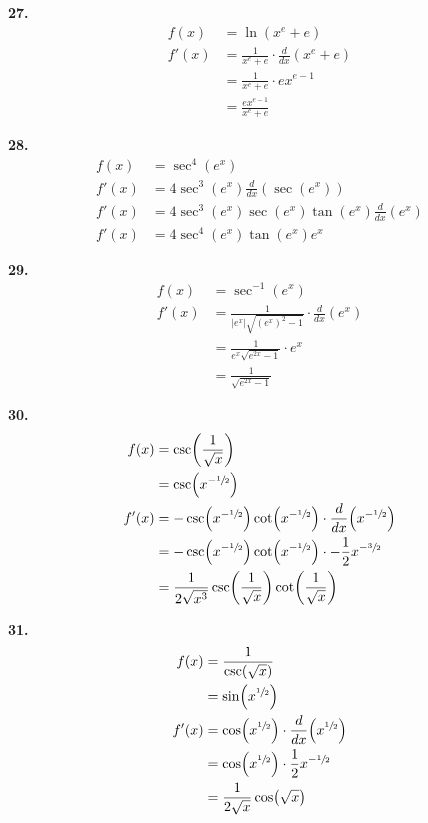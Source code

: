 \documentclass[10pt,oneside,]{book}
\theoremstyle{plain}
\theoremstyle{definition}
\numberwithin{equation}{section}
\newcommand{\fe}[2]{#1\mathopen{}\left(#2\right)\mathclose{}}
\newcommand{\fd}[1]{#1'}
\newcommand{\lzoo}[2]{{\frac{d}{d#1}}{\left(#2\right)}}
\newcommand{\abs}[1]{\left|#1\right|}
\begin{document}
\par\smallskip
\noindent\textbf{27.}\quad{}\begin{align*}
\fe{f}{x}&=\fe{\ln}{x^e+e}\\
\fe{\fd{f}}{x}&=\frac{1}{x^e+e}\cdot\lzoo{x}{x^e+e}\\
&=\frac{1}{x^e+e}\cdot ex^{e-1}\\
&=\frac{ex^{e-1}}{x^e+e}
\end{align*}%
\par\smallskip
\noindent\textbf{28.}\quad{}\begin{align*}
\fe{f}{x}&=\fe{\sec^4}{e^x}\\
\fe{\fd{f}}{x}&=4\fe{\sec^3}{e^x}\lzoo{x}{\fe{\sec}{e^x}}\\
\fe{\fd{f}}{x}&=4\fe{\sec^3}{e^x}\fe{\sec}{e^x}\fe{\tan}{e^x}\lzoo{x}{e^x}\\
\fe{\fd{f}}{x}&=4\fe{\sec^4}{e^x}\fe{\tan}{e^x}e^x
\end{align*}%
\par\smallskip
\noindent\textbf{29.}\quad{}\begin{align*}
\fe{f}{x}&=\fe{\sec^{-1}}{e^x}\\
\fe{\fd{f}}{x}&=\frac{1}{\abs{e^x}\sqrt{\left(e^x\right)^2-1}}\cdot\lzoo{x}{e^x}\\
&=\frac{1}{e^x\sqrt{e^{2x}-1}}\cdot e^x\\
&=\frac{1}{\sqrt{e^{2x}-1}}
\end{align*}%
\par\smallskip
\noindent\textbf{30.}\quad{}\begin{align*}
\fe{f}{x}&=\fe{\csc}{\frac{1}{\sqrt{x}}}\\
&=\fe{\csc}{x^{-\sfrac{1}{2}}}\\
\fe{\fd{f}}{x}&=-\fe{\csc}{x^{-\sfrac{1}{2}}}\fe{\cot}{x^{-\sfrac{1}{2}}}\cdot\lzoo{x}{x^{-\sfrac{1}{2}}}\\
&=-\fe{\csc}{x^{-\sfrac{1}{2}}}\fe{\cot}{x^{-\sfrac{1}{2}}}\cdot-\frac{1}{2}x^{-\sfrac{3}{2}}\\
&=\frac{1}{2\sqrt{x^3}}\fe{\csc}{\frac{1}{\sqrt{x}}}\fe{\cot}{\frac{1}{\sqrt{x}}}
\end{align*}%
\par\smallskip
\noindent\textbf{31.}\quad{}\begin{align*}
\fe{f}{x}&=\frac{1}{\fe{\csc}{\sqrt{x}}}\\
&=\fe{\sin}{x^{\sfrac{1}{2}}}\\
\fe{\fd{f}}{x}&=\fe{\cos}{x^{\sfrac{1}{2}}}\cdot\lzoo{x}{x^{\sfrac{1}{2}}}\\
&=\fe{\cos}{x^{\sfrac{1}{2}}}\cdot\frac{1}{2}x^{-\sfrac{1}{2}}\\
&=\frac{1}{2\sqrt{x}}\fe{\cos}{\sqrt{x}}
\end{align*}%
\end{document}
